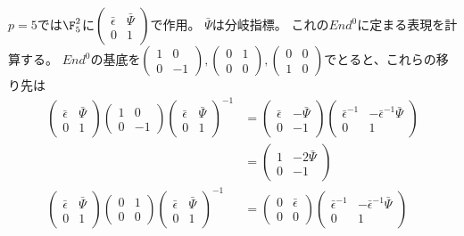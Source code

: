 \documentclass{jsarticle}
\begin{document}
$p=5$では$\F_5^2$に$\begin{pmatrix}\bar{\epsilon}&\bar{\Psi}\\0&1\end{pmatrix}$で作用。
$\bar{\Psi}$は分岐指標。
これの$End^0$に定まる表現を計算する。
$End^0$の基底を$\begin{pmatrix}1&0\\0&-1\end{pmatrix}, \begin{pmatrix}0&1\\0&0\end{pmatrix}, \begin{pmatrix}0&0\\1&0\end{pmatrix}$でとると、これらの移り先は
\begin{align*}
\begin{pmatrix}\bar{\epsilon}&\bar{\Psi}\\0&1\end{pmatrix}\begin{pmatrix}1&0\\0&-1\end{pmatrix}\begin{pmatrix}\bar{\epsilon}&\bar{\Psi}\\0&1\end{pmatrix}^{-1}
&=\begin{pmatrix}\bar{\epsilon}&-\bar{\Psi}\\0&-1\end{pmatrix}\begin{pmatrix}\bar{\epsilon}^{-1}&-\bar{\epsilon}^{-1}\bar{\Psi}\\0&1\end{pmatrix}\\
&=\begin{pmatrix}1&-2\bar{\Psi}\\0&-1\end{pmatrix}\\
\begin{pmatrix}\bar{\epsilon}&\bar{\Psi}\\0&1\end{pmatrix}\begin{pmatrix}0&1\\0&0\end{pmatrix}\begin{pmatrix}\bar{\epsilon}&\bar{\Psi}\\0&1\end{pmatrix}^{-1}
&=\begin{pmatrix}0&\bar{\epsilon}\\0&0\end{pmatrix}\begin{pmatrix}\bar{\epsilon}^{-1}&-\bar{\epsilon}^{-1}\bar{\Psi}\\0&1\end{pmatrix}\\

\end{align*}
\end{document}
